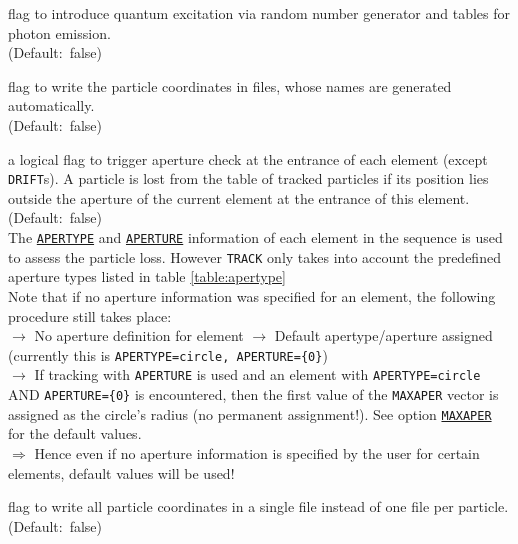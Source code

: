 \begin{madlist}
   flag to introduce quantum excitation via random
  number generator and tables for photon emission. \\ (Default:~false)

   flag to write the particle coordinates in files, whose
  names are generated automatically. \\ (Default:~false)

   a logical flag to trigger aperture check at the entrance 
  of each element (except \texttt{DRIFT}s). A particle is lost from the table of 
  tracked particles if its position lies outside the aperture of the current 
  element at the entrance of this element. \\ 
  (Default:~false) \\
  
  The \hyperref[chap:aperture]{\texttt{APERTYPE}} and 
  \hyperref[chap:aperture]{\texttt{APERTURE}} information of each element 
  in the sequence is used to assess the particle loss. 
  However \texttt{TRACK} only takes into account the predefined aperture 
  types listed in table \ref{table:apertype}
  \\
  
  Note that if no aperture information was specified for an element, 
  the following procedure still takes place:
  \\
  $\rightarrow$ No aperture definition for element $\rightarrow$ 
  Default apertype/aperture assigned (currently this is   
  \texttt{APERTYPE=circle, APERTURE=\{0\}}) 
  \\ $\rightarrow$  
  If tracking with \texttt{APERTURE} is used and an
  element with \texttt{APERTYPE=circle} AND \texttt{APERTURE=\{0\}}  
  is encountered, then the first value of the \texttt{MAXAPER} vector
  is assigned as the circle's radius (no permanent assignment!). 
  See option \hyperref[sec:run]{\texttt{MAXAPER}} for the default values. 
  \\ $\Rightarrow$
  Hence even if no aperture information is specified by the user for
  certain elements, default values will be used! 


   flag to write all particle coordinates in a single
  file instead of one file per particle. \\ (Default:~false)


\end{madlist}
